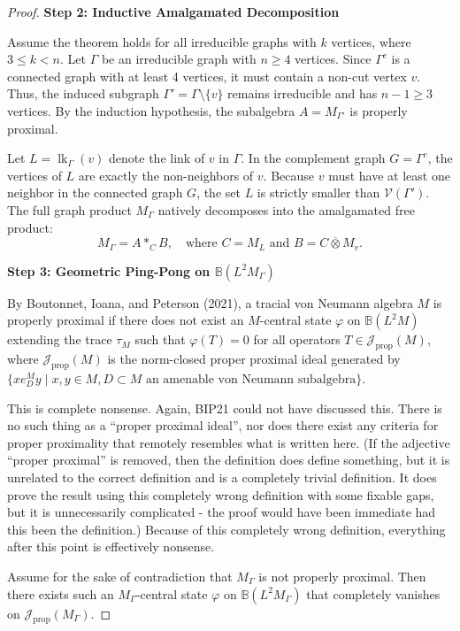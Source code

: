 \documentclass[12pt]{article}
\newcommand{\VV}{\mathcal{V}}
\newcommand{\review}[1]{\begin{reviewbox}#1\end{reviewbox}}
\begin{document}
\begin{proof}
\medskip\noindent\textbf{Step 2: Inductive Amalgamated Decomposition}

Assume the theorem holds for all irreducible graphs with $k$ vertices, where $3 \le k < n$. Let $\Gamma$ be an irreducible graph with $n \ge 4$ vertices. Since $\Gamma^c$ is a connected graph with at least 4 vertices, it must contain a non-cut vertex $v$. Thus, the induced subgraph $\Gamma' = \Gamma \setminus \{v\}$ remains irreducible and has $n-1 \ge 3$ vertices. By the induction hypothesis, the subalgebra $A = M_{\Gamma'}$ is properly proximal.

Let $L = \operatorname{lk}_\Gamma(v)$ denote the link of $v$ in $\Gamma$. In the complement graph $G = \Gamma^c$, the vertices of $L$ are exactly the non-neighbors of $v$. Because $v$ must have at least one neighbor in the connected graph $G$, the set $L$ is strictly smaller than $\VV(\Gamma')$.
The full graph product $M_\Gamma$ natively decomposes into the amalgamated free product:
\[
M_\Gamma = A \ast_C B, \quad \text{where } C = M_L \text{ and } B = C \overline{\otimes} M_v.
\]

\medskip\noindent\textbf{Step 3: Geometric Ping-Pong on $\mathbb{B}(L^2M_\Gamma)$}

By Boutonnet, Ioana, and Peterson (2021), a tracial von Neumann algebra $M$ is properly proximal if there does not exist an $M$-central state $\varphi$ on $\mathbb{B}(L^2M)$ extending the trace $\tau_M$ such that $\varphi(T) = 0$ for all operators $T \in \mathcal{J}_{\mathrm{prop}}(M)$, where $\mathcal{J}_{\mathrm{prop}}(M)$ is the norm-closed proper proximal ideal generated by $\{x e_D^M y \mid x, y \in M, D \subset M \text{ an amenable von Neumann subalgebra}\}$.

\review{This is complete nonsense. Again, BIP21 could not have discussed this. There is no such thing as a ``proper proximal ideal'', nor does there exist any criteria for proper proximality that remotely resembles what is written here. (If the adjective ``proper proximal'' is removed, then the definition does define something, but it is unrelated to the correct definition and is a completely trivial definition. It does prove the result using this completely wrong definition with some fixable gaps, but it is unnecessarily complicated - the proof would have been immediate had this been the definition.) Because of this completely wrong definition, everything after this point is effectively nonsense.}

Assume for the sake of contradiction that $M_\Gamma$ is not properly proximal. Then there exists such an $M_\Gamma$-central state $\varphi$ on $\mathbb{B}(L^2M_\Gamma)$ that completely vanishes on $\mathcal{J}_{\mathrm{prop}}(M_\Gamma)$.


\end{proof}
\end{document}
